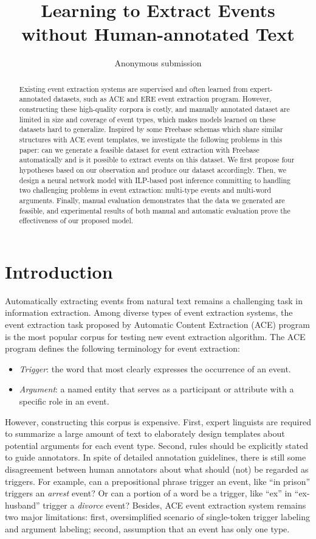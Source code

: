 \documentclass{article}
\title{Learning to Extract Events without Human-annotated Text}
\author{Anonymous submission}
\begin{document}
\maketitle

\begin{abstract}
Existing event extraction systems are supervised and often learned from expert-annotated datasets, such as ACE and ERE event extraction program. However, constructing these high-quality corpora is costly, and manually annotated dataset are limited in size and coverage of event types, which makes models learned on these datasets hard to generalize. Inspired by some Freebase schemas which share similar structures with ACE event templates, we investigate the following problems in this paper: can we generate a feasible dataset for event extraction with Freebase automatically and is it possible to extract events on this dataset. We first propose four hypotheses based on our observation and produce our dataset accordingly. Then, we design a neural network model with ILP-based post inference committing to handling two challenging problems in event extraction: multi-type events and multi-word arguments. Finally, manual evaluation demonstrates that the data we generated are feasible, and experimental results of both manual and automatic evaluation prove the effectiveness of our proposed model.
\end{abstract}

\section{Introduction}
Automatically extracting events from natural text remains a challenging task in information extraction. Among diverse types of event extraction systems, the event extraction task proposed by Automatic Content Extraction (ACE) program is the most popular corpus for testing new event extraction algorithm. The ACE program defines the following terminology for event extraction:
\begin{itemize}
	\item \emph{Trigger}: the word that most clearly expresses the occurrence of an event.
	\item \emph{Argument}: a named entity that serves as a participant or attribute with a specific role in an event.
\end{itemize}

However, constructing this corpus is expensive. First, expert linguists are required to summarize a large amount of text to elaborately design templates about potential arguments for each event type. Second, rules should be explicitly stated to guide annotators. In spite of detailed annotation guidelines, there is still some disagreement between human annotators about what should (not) be regarded as triggers. For example, can a prepositional phrase trigger an event, like ``in prison'' triggers an \emph{arrest} event? Or can a portion of a word be a trigger, like ``ex'' in ``ex-husband'' trigger a \emph{divorce} event?
Besides, ACE event extraction system remains two major limitations:  first, oversimplified scenario of single-token trigger labeling and argument labeling; second, assumption that an event has only one type.
\end{document}
